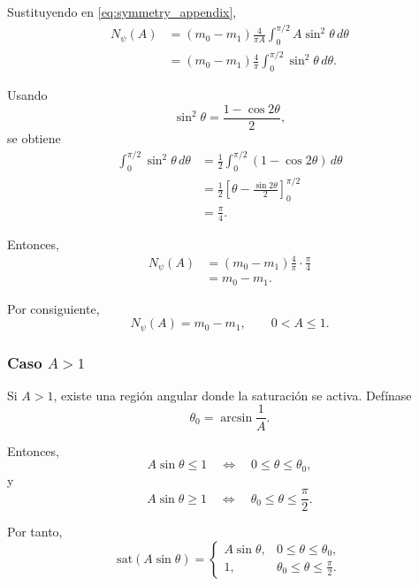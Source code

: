 \documentclass[journal]{IEEEtran}
\begin{document}
Sustituyendo en \eqref{eq:symmetry_appendix},
\begin{align}
N_\psi(A)
&=
(m_0-m_1)
\frac{4}{\pi A}
\int_0^{\pi/2}
A\sin^2\theta\,d\theta
\\
&=
(m_0-m_1)
\frac{4}{\pi}
\int_0^{\pi/2}
\sin^2\theta\,d\theta.
\end{align}

Usando
\begin{equation}
\sin^2\theta
=
\frac{1-\cos 2\theta}{2},
\end{equation}
se obtiene
\begin{align}
\int_0^{\pi/2}\sin^2\theta\,d\theta
&=
\frac12
\int_0^{\pi/2}(1-\cos 2\theta)\,d\theta
\\
&=
\frac12
\left[
\theta-\frac{\sin 2\theta}{2}
\right]_0^{\pi/2}
\\
&=
\frac{\pi}{4}.
\end{align}

Entonces,
\begin{align}
N_\psi(A)
&=
(m_0-m_1)
\frac{4}{\pi}
\cdot
\frac{\pi}{4}
\\
&=
m_0-m_1.
\end{align}

Por consiguiente,
\begin{equation}
\label{eq:Npsi_small_appendix}
N_\psi(A)=m_0-m_1,
\qquad
0<A\leq 1.
\end{equation}

\subsubsection*{Caso \(A>1\)}

Si \(A>1\), existe una región angular donde la saturación se activa.
Defínase
\begin{equation}
\label{eq:theta0_appendix}
\theta_0=\arcsin\frac{1}{A}.
\end{equation}

Entonces,
\[
A\sin\theta\leq 1
\quad
\Longleftrightarrow
\quad
0\leq\theta\leq\theta_0,
\]
y
\[
A\sin\theta\geq 1
\quad
\Longleftrightarrow
\quad
\theta_0\leq\theta\leq\frac{\pi}{2}.
\]

Por tanto,
\begin{equation}
\mathrm{sat}(A\sin\theta)
=
\begin{cases}
A\sin\theta,
&
0\leq\theta\leq\theta_0,
\\
1,
&
\theta_0\leq\theta\leq\frac{\pi}{2}.
\end{cases}
\end{equation}
\end{document}
